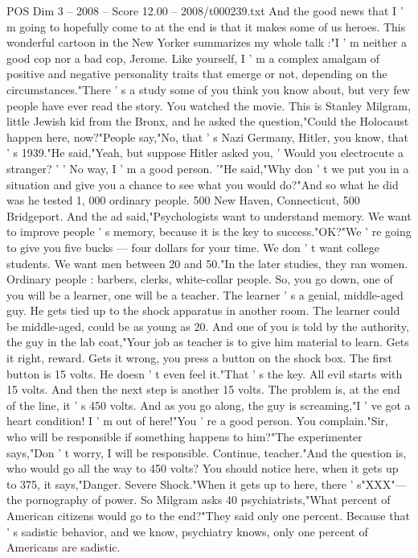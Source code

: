 \begin{textsample}{POS Dim 3 – 2008 – Score 12.00 – 2008/t000239.txt}
And the good news that I ' m going to hopefully come to at the end is that it makes some of us heroes.
This wonderful cartoon in the New Yorker summarizes my whole talk :"I ' m neither a good cop nor a bad cop, Jerome.
Like yourself, I ' m a complex amalgam of positive and negative personality traits that emerge or not, depending on the circumstances."There ' s a study some of you think you know about, but very few people have ever read the story.
You watched the movie.
This is Stanley Milgram, little Jewish kid from the Bronx, and he asked the question,"Could the Holocaust happen here, now?"People say,"No, that ' s Nazi Germany, Hitler, you know, that ' s 1939."He said,"Yeah, but suppose Hitler asked you, ' Would you electrocute a stranger? ' ' No way, I ' m a good person. '"He said,"Why don ' t we put you in a situation and give you a chance to see what you would do?"And so what he did was he tested 1, 000 ordinary people. 500 New Haven, Connecticut, 500 Bridgeport.
And the ad said,"Psychologists want to understand memory.
We want to improve people ' s memory, because it is the key to success."OK?"We ' re going to give you five bucks — four dollars for your time.
We don ' t want college students.
We want men between 20 and 50."In the later studies, they ran women.
Ordinary people : barbers, clerks, white-collar people.
So, you go down, one of you will be a learner, one will be a teacher.
The learner ' s a genial, middle-aged guy.
He gets tied up to the shock apparatus in another room.
The learner could be middle-aged, could be as young as 20.
And one of you is told by the authority, the guy in the lab coat,"Your job as teacher is to give him material to learn.
Gets it right, reward.
Gets it wrong, you press a button on the shock box.
The first button is 15 volts.
He doesn ' t even feel it."That ' s the key.
All evil starts with 15 volts.
And then the next step is another 15 volts.
The problem is, at the end of the line, it ' s 450 volts.
And as you go along, the guy is screaming,"I ' ve got a heart condition!
I ' m out of here!"You ' re a good person.
You complain."Sir, who will be responsible if something happens to him?"The experimenter says,"Don ' t worry, I will be responsible.
Continue, teacher."And the question is, who would go all the way to 450 volts?
You should notice here, when it gets up to 375, it says,"Danger.
Severe Shock."When it gets up to here, there ' s"XXX"— the pornography of power.
So Milgram asks 40 psychiatrists,"What percent of American citizens would go to the end?"They said only one percent.
Because that ' s sadistic behavior, and we know, psychiatry knows, only one percent of Americans are sadistic.

\end{textsample}
